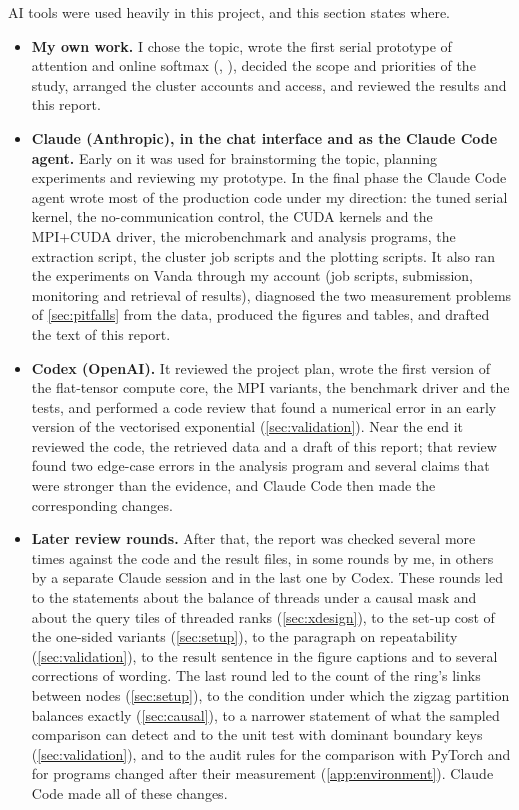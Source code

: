AI tools were used heavily in this project, and this section states where.

\begin{itemize}
\item \textbf{My own work.} I chose the topic, wrote the first serial prototype
of attention and online softmax (, ),
decided the scope and priorities of the study, arranged the cluster accounts and
access, and reviewed the results and this report.
\item \textbf{Claude (Anthropic), in the chat interface and as the Claude Code
agent.} Early on it was used for brainstorming the topic, planning experiments and
reviewing my prototype. In the final phase the Claude Code agent wrote most of the
production code under my direction: the tuned serial kernel, the no-communication
control, the CUDA kernels and the MPI+CUDA driver, the microbenchmark and analysis
programs, the extraction script, the cluster job scripts and the plotting scripts.
It also ran the experiments on Vanda through my account (job scripts, submission,
monitoring and retrieval of results), diagnosed the two measurement problems of
\cref{sec:pitfalls} from the data, produced the figures and tables, and drafted the
text of this report.
\item \textbf{Codex (OpenAI).} It reviewed the project plan, wrote the first version
of the flat-tensor compute core, the MPI variants, the benchmark driver and the
tests, and performed a code review that found a numerical error in an early version
of the vectorised exponential (\cref{sec:validation}). Near the end it reviewed the
code, the retrieved data and a draft of this report; that review found two edge-case
errors in the analysis program and several claims that were stronger than the
evidence, and Claude Code then made the corresponding changes.
\item \textbf{Later review rounds.} After that, the report was checked several
more times against the code and the result files, in some rounds by me, in others
by a separate Claude session and in the last one by Codex. These rounds led to the statements about the balance of threads under a causal
mask and about the query tiles of threaded ranks (\cref{sec:xdesign}), to the
set-up cost of the one-sided variants (\cref{sec:setup}), to the paragraph on
repeatability (\cref{sec:validation}), to the result sentence in the figure
captions and to several corrections of wording. The last round led to the count
of the ring's links between nodes (\cref{sec:setup}), to the condition under which
the zigzag partition balances exactly (\cref{sec:causal}), to a narrower statement
of what the sampled comparison can detect and to the unit test with dominant
boundary keys (\cref{sec:validation}), and to the audit rules for the comparison
with PyTorch and for programs changed after their measurement
(\cref{app:environment}). Claude Code made all of these changes.
\end{itemize}

